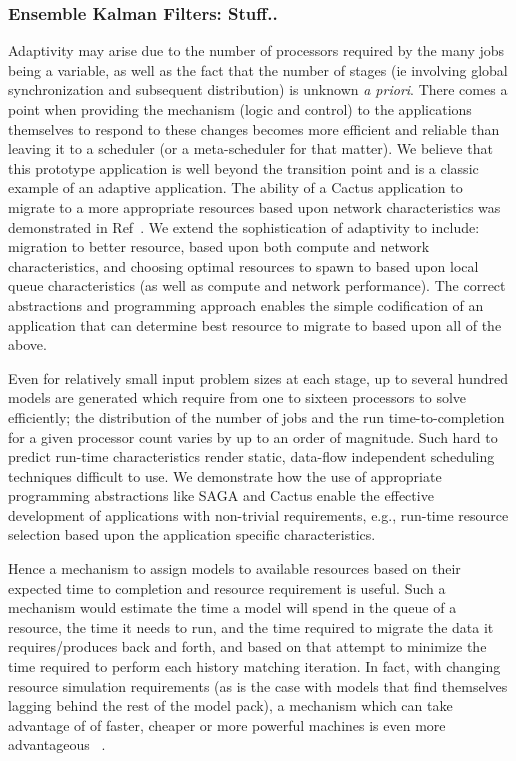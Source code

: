 \documentclass[conference,final]{IEEEtran}
\begin{document}
\subsubsection{Ensemble Kalman Filters: Stuff..} Adaptivity may arise
due to the number of processors required by the many jobs being a
variable, as well as the fact that the number of stages (ie involving
global synchronization and subsequent distribution) is unknown {\it a
  priori}. There comes a point when providing the mechanism (logic and
control) to the applications themselves to respond to these changes
becomes more efficient and reliable than leaving it to a scheduler (or
a meta-scheduler for that matter). We believe that this prototype
application is well beyond the transition point and is a classic
example of an adaptive application.  The ability of a Cactus
application to migrate to a more appropriate resources based upon
network characteristics was demonstrated in Ref~\cite{escience07}.  We
extend the sophistication of adaptivity to include: migration to
better resource, based upon both compute and network characteristics,
and choosing optimal resources to spawn to based upon local queue
characteristics (as well as compute and network performance). The
correct abstractions and programming approach enables the simple
codification of an application that can determine best resource to
migrate to based upon all of the above.

Even for relatively small input problem sizes at each stage, up to
several hundred models are generated which require from one to sixteen
processors to solve efficiently; the distribution of the number of
jobs and the run time-to-completion for a given processor count varies
by up to an order of magnitude.  Such hard to predict run-time
characteristics render static, data-flow independent scheduling
techniques difficult to use.  We demonstrate how the use of
appropriate programming abstractions like SAGA and Cactus enable the
effective development of applications with non-trivial requirements,
e.g., run-time resource selection based upon the application specific
characteristics.

Hence a mechanism to assign models to available resources based on
their expected time to completion and resource requirement is useful.
Such a mechanism would estimate the time a model will spend in the
queue of a resource, the time it needs to run, and the time required
to migrate the data it requires/produces back and forth, and based on
that attempt to minimize the time required to perform each history
matching iteration.  In fact, with changing resource simulation
requirements (as is the case with models that find themselves lagging
behind the rest of the model pack), a mechanism which can take
advantage of of faster, cheaper or more powerful machines is even more
advantageous ~\cite{escience07}.
\end{document}
